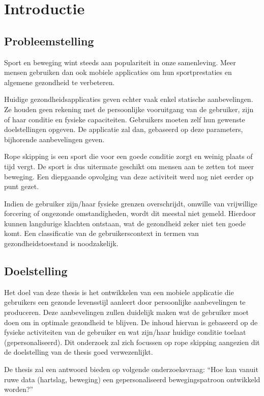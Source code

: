 \chapter*{Introductie}

\section*{Probleemstelling}
Sport en beweging wint steeds aan populariteit in onze samenleving. Meer mensen gebruiken dan ook mobiele applicaties om hun sportprestaties en algemene gezondheid te verbeteren.  

Huidige gezondheidsapplicaties geven echter vaak enkel statische aanbevelingen. Ze houden geen rekening met de persoonlijke vooruitgang van de gebruiker, zijn of haar conditie en fysieke capaciteiten.  Gebruikers moeten zelf hun gewenste doelstellingen opgeven. De applicatie zal dan, gebaseerd op deze parameters, bijhorende aanbevelingen geven. 

Rope skipping is een sport die voor een goede conditie zorgt en weinig plaats of tijd vergt. De sport is dus uitermate geschikt om mensen aan te zetten tot meer beweging. Een diepgaande opvolging van deze activiteit werd nog niet eerder op punt gezet.
 
Indien de gebruiker zijn/haar fysieke grenzen overschrijdt, omwille van vrijwillige forcering of ongezonde omstandigheden, wordt dit meestal niet gemeld. Hierdoor kunnen langdurige klachten ontstaan, wat de gezondheid zeker niet ten goede komt. Een classificatie van de gebruikerscontext in termen van gezondheidstoestand is noodzakelijk. 
 
\section*{Doelstelling}
Het doel van deze thesis is het ontwikkelen van een mobiele applicatie die gebruikers een gezonde levensstijl aanleert door persoonlijke aanbevelingen te produceren. Deze aanbevelingen zullen duidelijk maken wat de gebruiker moet doen om in optimale gezondheid te blijven. De inhoud hiervan is gebaseerd op de fysieke activiteiten van de gebruiker en wat zijn/haar huidige conditie toelaat (gepersonaliseerd). Dit onderzoek zal zich focussen op rope skipping aangezien dit de doelstelling van de thesis goed verwezenlijkt. 
 
De thesis zal een antwoord bieden op volgende onderzoeksvraag: “Hoe kan vanuit ruwe data (hartslag, beweging) een gepersonaliseerd bewegingspatroon ontwikkeld worden?” 

